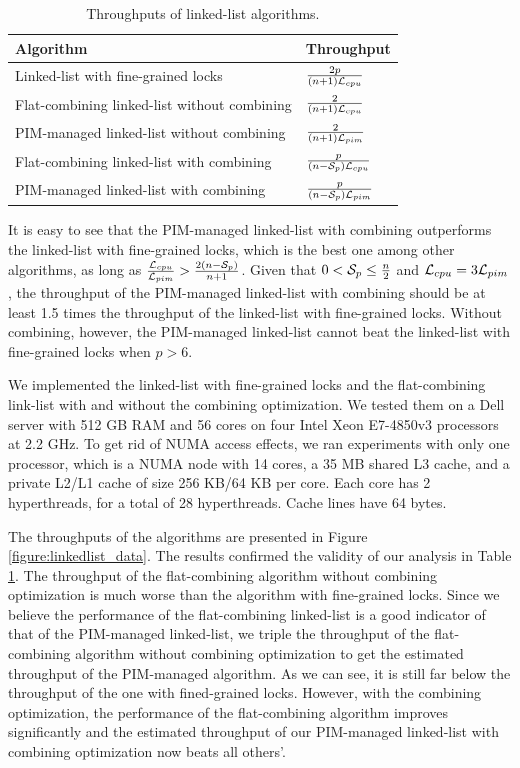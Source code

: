 \begin{table}[ht!]
\begin{center}
    \begin{tabular}{| >{\small}l | l |}
    \hline
    Algorithm & Throughput\\ \hline
    Linked-list with fine-grained locks & ${2p \over (n+1)\mathcal{L}_{cpu}}$ \\ \hline
    Flat-combining linked-list without combining & ${2 \over (n+1)\mathcal{L}_{cpu}}$ \\ \hline
    PIM-managed linked-list without combining & ${2 \over (n+1)\mathcal{L}_{pim}}$ \\ \hline
    Flat-combining linked-list with combining & ${p \over (n-\mathcal{S}_{p})\mathcal{L}_{cpu}}$ \\ \hline
    PIM-managed linked-list with combining & ${p \over (n-\mathcal{S}_{p})\mathcal{L}_{pim}}$ \\ \hline
    \end{tabular}
\end{center}
\caption{Throughputs of linked-list algorithms.}
\label{tab:linkedlist}
\end{table}


It is easy to see that the PIM-managed linked-list with combining outperforms 
the linked-list with fine-grained locks, which is the best one among other algorithms, 
as long as ${\mathcal{L}_{cpu} \over \mathcal{L}_{pim}} > {2(n - \mathcal{S}_{p})\over n + 1}$.
Given that $0 < \mathcal{S}_{p} \le {n \over 2}$ and $\mathcal{L}_{cpu} = 3\mathcal{L}_{pim}$,
the throughput of the PIM-managed linked-list with combining should be at least 
1.5 times the throughput of the linked-list with fine-grained locks.
Without combining, however, the PIM-managed linked-list cannot
beat the linked-list with fine-grained locks when $p > 6$.

We implemented the linked-list with fine-grained locks and the flat-combining link-list 
with and without the combining optimization.
We tested them on a Dell server with 512 GB RAM and 
56 cores on four Intel Xeon E7-4850v3 processors at 2.2 GHz.
To get rid of NUMA access effects, we ran experiments with only one processor, 
which is a NUMA node with 14 cores, a 35 MB shared L3 cache, 
and a private L2/L1 cache of size 256 KB/64 KB per core. 
Each core has 2 hyperthreads, for a total of 28 hyperthreads. 
Cache lines have 64 bytes.

The throughputs of the algorithms are presented in Figure \ref{figure:linkedlist_data}.
The results confirmed the validity of our analysis in Table \ref{tab:linkedlist}.
The throughput of the flat-combining algorithm without combining optimization
is much worse than the algorithm with fine-grained locks.
Since we believe the performance of the flat-combining linked-list is a good 
indicator of that of the PIM-managed linked-list, we triple the throughput of the
flat-combining algorithm without combining optimization to get the estimated
throughput of the PIM-managed algorithm. 
As we can see, it is still far below the throughput of the one with fined-grained locks.
However, with the combining optimization, the performance of the flat-combining
algorithm improves significantly and the estimated throughput of our PIM-managed
linked-list with combining optimization now beats all others'.

